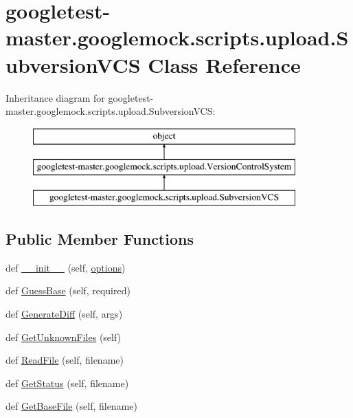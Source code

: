 \hypertarget{classgoogletest-master_1_1googlemock_1_1scripts_1_1upload_1_1_subversion_v_c_s}{}\section{googletest-\/master.googlemock.\+scripts.\+upload.\+Subversion\+V\+CS Class Reference}
\label{classgoogletest-master_1_1googlemock_1_1scripts_1_1upload_1_1_subversion_v_c_s}
Inheritance diagram for googletest-\/master.googlemock.\+scripts.\+upload.\+Subversion\+V\+CS\+:\begin{figure}[H]
\begin{center}
\leavevmode
\includegraphics[height=3.000000cm]{dc/d0b/classgoogletest-master_1_1googlemock_1_1scripts_1_1upload_1_1_subversion_v_c_s}
\end{center}
\end{figure}
\subsection*{Public Member Functions}
\begin{DoxyCompactItemize}
\item 
def \mbox{\hyperlink{classgoogletest-master_1_1googlemock_1_1scripts_1_1upload_1_1_subversion_v_c_s_aa558fc2bff9fdd594771654c79edc241}{\+\_\+\+\_\+init\+\_\+\+\_\+}} (self, \mbox{\hyperlink{classgoogletest-master_1_1googlemock_1_1scripts_1_1upload_1_1_version_control_system_a310493168408513d7aac348752afd91d}{options}})
\item 
def \mbox{\hyperlink{classgoogletest-master_1_1googlemock_1_1scripts_1_1upload_1_1_subversion_v_c_s_a60b8e69a26aacc2d4e2254bfc032aeed}{Guess\+Base}} (self, required)
\item 
def \mbox{\hyperlink{classgoogletest-master_1_1googlemock_1_1scripts_1_1upload_1_1_subversion_v_c_s_aff69672a08c22f4c2ecc5b4469aa7a3f}{Generate\+Diff}} (self, args)
\item 
def \mbox{\hyperlink{classgoogletest-master_1_1googlemock_1_1scripts_1_1upload_1_1_subversion_v_c_s_aeab242f9211ebbb726d3b3a6631a0090}{Get\+Unknown\+Files}} (self)
\item 
def \mbox{\hyperlink{classgoogletest-master_1_1googlemock_1_1scripts_1_1upload_1_1_subversion_v_c_s_a2d874d30f4feb76ca94e825221380f98}{Read\+File}} (self, filename)
\item 
def \mbox{\hyperlink{classgoogletest-master_1_1googlemock_1_1scripts_1_1upload_1_1_subversion_v_c_s_aa07ad40d678e8844ca8d326375ccf2cb}{Get\+Status}} (self, filename)
\item 
def \mbox{\hyperlink{classgoogletest-master_1_1googlemock_1_1scripts_1_1upload_1_1_subversion_v_c_s_a9e920210f36bc2a1f48d8e11aa4ba579}{Get\+Base\+File}} (self, filename)
\end{DoxyCompactItemize}
